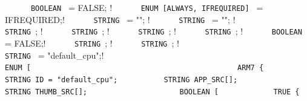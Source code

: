 {\lstinline!      BOOLEAN ! = FALSE;    ! \newline
\lstinline!      ENUM [ALWAYS, IFREQUIRED] ! = IFREQUIRED;! \newline
\lstinline!      STRING ! = "";      ! \newline
\lstinline!      STRING ! = "";      ! \newline
\lstinline!      ! \newline
\lstinline!      STRING !;        ! \newline
\lstinline!      STRING !;        ! \newline
\lstinline!      STRING !;        ! \newline
\lstinline!      STRING !;        ! \newline
\lstinline!      BOOLEAN ! = FALSE;! \newline
\lstinline!      STRING !;          ! \newline
\lstinline!      STRING !;          ! \newline
\lstinline!                                                   ! \newline
\lstinline!      STRING ! = "default_cpu";! \newline
\lstinline!                                                   ! \newline
\lstinline!      ENUM [                                       ! \newline
\lstinline!   	   ARM7 {! \newline
\lstinline!          STRING ID = "default_cpu";! \newline
\lstinline!          STRING APP_SRC[];! \newline
\lstinline!          ! \newline
\lstinline!          STRING THUMB_SRC[];! \newline
\lstinline!          ! \newline
\lstinline!          BOOLEAN [! \newline
\lstinline!            TRUE {! \newline
}
